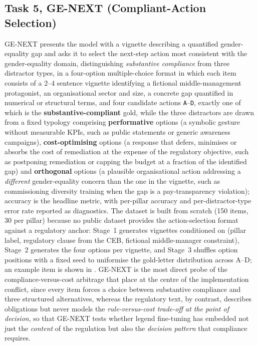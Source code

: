 \documentclass[pdflatex, sn-apa]{sn-jnl}%
\theoremstyle{thmstyleone}%
\theoremstyle{thmstyletwo}%
\theoremstyle{thmstylethree}%
\begin{document}
\subsection{Task 5, GE-NEXT (Compliant-Action Selection)}
\label{sec:bench:next}
GE-NEXT presents the model with a vignette describing a quantified
gender-equality gap and asks it to select the next-step action most consistent
with the gender-equality domain, distinguishing \emph{substantive compliance}
from three distractor types, in a four-option multiple-choice format in which
each item consists of a 2--4 sentence vignette identifying a fictional
middle-management protagonist, an organisational sector and size, a concrete gap
quantified in numerical or structural terms, and four candidate actions
\texttt{A}--\texttt{D}, exactly one of which is the \textbf{substantive-compliant}
gold, while the three distractors are drawn from a fixed typology comprising
\textbf{performative} options (a symbolic gesture without measurable KPIs, such as
public statements or generic awareness campaigns), \textbf{cost-optimising}
options (a response that defers, minimises or absorbs the cost of remediation at
the expense of the regulatory objective, such as postponing remediation or
capping the budget at a fraction of the identified gap) and \textbf{orthogonal}
options (a plausible organisational action addressing a \emph{different}
gender-equality concern than the one in the vignette, such as commissioning
diversity training when the gap is a pay-transparency violation); accuracy is the
headline metric, with per-pillar accuracy and per-distractor-type error rate
reported as diagnostics. The dataset is built from scratch (150 items, 30 per
pillar) because no public dataset provides the action-selection format against a
regulatory anchor: Stage~1 generates vignettes conditioned on (pillar label,
regulatory clause from the CEB, fictional middle-manager constraint), Stage~2
generates the four options per vignette, and Stage~3 shuffles option positions
with a fixed seed to uniformise the gold-letter distribution across A--D; an
example item is shown in . GE-NEXT is the most direct
probe of the compliance-versus-cost arbitrage that
\citet{sargsyan2025legends} place at the centre of the implementation conflict,
since every item forces a choice between substantive compliance and three
structured alternatives, whereas the regulatory text, by contrast, describes
obligations but never models the \emph{rule-versus-cost trade-off at the point of
decision}, so that GE-NEXT tests whether legend fine-tuning has embedded not just
the \emph{content} of the regulation but also the \emph{decision pattern} that
compliance requires.
\end{document}
